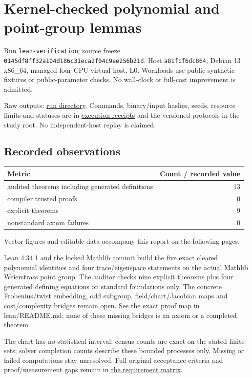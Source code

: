 \documentclass[
  10pt,
  letterpaper,
  landscape]{article}
\author{}
\date{}
\begin{document}
\section{Kernel-checked polynomial and point-group
lemmas}\label{kernel-checked-polynomial-and-point-group-lemmas}

Run \texttt{lean-verification}; source freeze
\texttt{0145df8ff32a104d186c31eca2f04c9ee256b21d}. Host
\texttt{a81fcf6dc864}, Debian 13 x86\_64, managed four-CPU virtual host,
L0. Workloads use public synthetic fixtures or public-parameter checks.
No wall-clock or full-cost improvement is admitted.

Raw outputs: \href{../../../lean/receipts/}{run directory}. Commands,
binary/input hashes, seeds, resource limits and statuses are in
\href{../../../execution-v1/}{execution receipts} and the versioned
protocols in the study root. No independent-host replay is claimed.

\subsection{Recorded observations}\label{recorded-observations}

\begin{longtable}[]{@{}lr@{}}
\toprule\noalign{}
Metric & Count / recorded value \\
\midrule\noalign{}
\endhead
\bottomrule\noalign{}
\endlastfoot
audited theorems including generated definitions & 13 \\
compiler trusted proofs & 0 \\
explicit theorems & 9 \\
nonstandard axiom failures & 0 \\
\end{longtable}

Vector figures and editable data accompany this report on the following pages.

Lean 4.34.1 and the locked Mathlib commit build the five exact cleared
polynomial identities and four trace/eigenspace statements on the actual
Mathlib Weierstrass point group. The auditor checks nine explicit
theorems plus four generated defining equations on standard foundations
only. The concrete Frobenius/twist embedding, odd subgroup,
field/chart/Jacobian maps and cost/complexity bridges remain open. See
the exact proof map in lean/README.md; none of these missing bridges is
an axiom or a completed theorem.

The chart has no statistical interval: census counts are exact on the
stated finite sets; solver completion counts describe these bounded
processes only. Missing or failed computations stay unresolved. Full
original acceptance criteria and proof/measurement gaps remain in
\href{../../../EXPERIMENTS.md}{the requirement matrix}.
\end{document}
